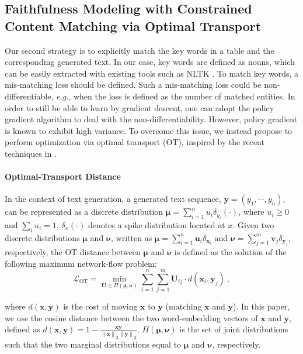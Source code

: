 \documentclass[11pt,a4paper]{article}
\begin{document}
\subsection {Faithfulness Modeling with Constrained Content Matching via Optimal Transport} \label{sec:OT}
Our second strategy is to explicitly match the key words in a table and the corresponding generated text. In our case, key words are defined as nouns, which can be easily extracted with existing tools such as NLTK \cite{loper2002}. To match key words, a mis-matching loss should be defined. Such a mis-matching loss could be non-differentiable, {\it e.g.}, when the loss is defined as the number of matched entities. In order to still be able to learn by gradient descent, one can adopt the policy gradient algorithm to deal with the non-differentiability. However, policy gradient is known to exhibit high variance. To overcome this issue, we instead propose to perform optimization via optimal transport (OT), inspired by the recent techniques in \cite{liqun2019}.


\paragraph{Optimal-Transport Distance}
In the context of text generation, a generated text sequence, $\bm{y} = (y_1, \cdots, y_n)$, can be represented as a discrete distribution $\bm{\mu} = \sum_{i=1}^n u_i\delta_{y_i}(\cdot)$, where $u_i \geq 0$ and $\sum_iu_i = 1$, $\delta_x(\cdot)$ denotes a spike distribution located at $x$. Given two discrete distributions $\bm{\mu}$ and $\bm{\nu}$, written as $\bm{\mu} = \sum_{i=1} ^ {n} \bm{u}_{i}  \delta_{\bm{x}_i}$ and $\bm{\nu} = \sum_{j=1} ^ {m} \bm{v}_{j}  \delta_{\bm{y}_j}$, respectively, the OT distance between $\bm{\mu}$ and $\bm{\nu}$ is defined as the solution of the following maximum network-flow problem: 
\vspace{-0.3cm}
\begin{equation}\label{eq:OTloss}
 \mathcal{L}_{\text{OT}} =  \underset {\bm{U}  \in \Pi(\bm{\mu}, \bm{\nu})} {\min}  \sum_{i=1} ^{n} \sum_{j=1} ^{m} \bm{U}_{ij} \cdot d(\bm{x}_i,\bm{y}_j)~,
\end{equation}\par\vspace{-0.3cm}
\noindent where $d(\mathbf{x},\mathbf{y})$ is the cost of moving $\mathbf{x}$ to $\mathbf{y}$ (matching $\mathbf{x}$ and $\mathbf{y}$). In this paper, we use the cosine distance between the two word-embedding vectors of $\mathbf{x}$ and $\mathbf{y}$, defined as $d(\mathbf{x},\mathbf{y})= 1- \frac{\mathbf{x} \mathbf{y}}{{\rVert \mathbf{x} \rVert}_2  {\rVert \mathbf{y} \rVert}_2}$. $\Pi(\bm{\mu}, \bm{\nu})$ is the set of joint distributions such that the two marginal distributions equal to $\bm{\mu}$ and $\bm{\nu}$, respectively.
\end{document}

